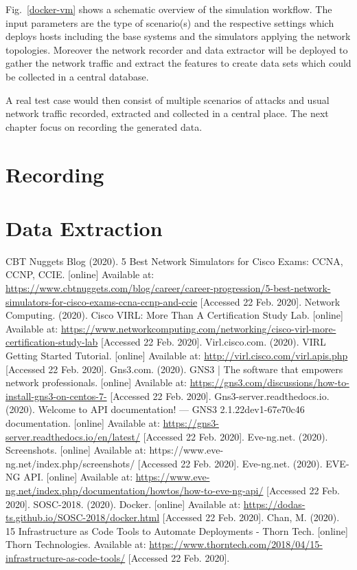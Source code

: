 \documentclass[conference]{IEEEtran}
\begin{document}
Fig.~\ref{docker-vm} shows a schematic overview of the simulation workflow. The input parameters are the type of scenario(s) and the respective settings which deploys hosts including the base systems and the simulators applying the network topologies. Moreover the network recorder and data extractor will be deployed to gather the network traffic and extract the features to create data sets which could be collected in a central database.

A real test case would then consist of multiple scenarios of attacks and usual network traffic recorded, extracted and collected in a central place. The next chapter focus on recording the generated data.

\section{Recording}

\section{Data Extraction}

\begin{thebibliography}{00}
 CBT Nuggets Blog (2020). 5 Best Network Simulators for Cisco Exams: CCNA, CCNP, CCIE. [online] Available at: \newline\url{https://www.cbtnuggets.com/blog/career/career-progression/5-best-network-simulators-for-cisco-exams-ccna-ccnp-and-ccie} [Accessed 22 Feb. 2020].
 Network Computing. (2020). Cisco VIRL: More Than A Certification Study Lab. [online] Available at: \url{https://www.networkcomputing.com/networking/cisco-virl-more-certification-study-lab} [Accessed 22 Feb. 2020].
 Virl.cisco.com. (2020). VIRL Getting Started Tutorial. [online] Available at: \url{http://virl.cisco.com/virl.apis.php} [Accessed 22 Feb. 2020].
 Gns3.com. (2020). GNS3 | The software that empowers network professionals. [online] Available at: \url{https://gns3.com/discussions/how-to-install-gns3-on-centos-7-} [Accessed 22 Feb. 2020].
 Gns3-server.readthedocs.io. (2020). Welcome to API documentation! — GNS3 2.1.22dev1-67e70c46 documentation. [online] Available at: \url{https://gns3-server.readthedocs.io/en/latest/} [Accessed 22 Feb. 2020].
 Eve-ng.net. (2020). Screenshots. [online] Available at: https://www.eve-ng.net/index.php/screenshots/ [Accessed 22 Feb. 2020].
 Eve-ng.net. (2020). EVE-NG API. [online] Available at: \url{https://www.eve-ng.net/index.php/documentation/howtos/how-to-eve-ng-api/} [Accessed 22 Feb. 2020].
 SOSC-2018. (2020). Docker. [online] Available at: \url{https://dodas-ts.github.io/SOSC-2018/docker.html} [Accessed 22 Feb. 2020].
 Chan, M. (2020). 15 Infrastructure as Code Tools to Automate Deployments - Thorn Tech. [online] Thorn Technologies. Available at: \url{https://www.thorntech.com/2018/04/15-infrastructure-as-code-tools/} [Accessed 22 Feb. 2020].
\end{thebibliography}
\vspace{12pt}
\color{red}
\end{document}
